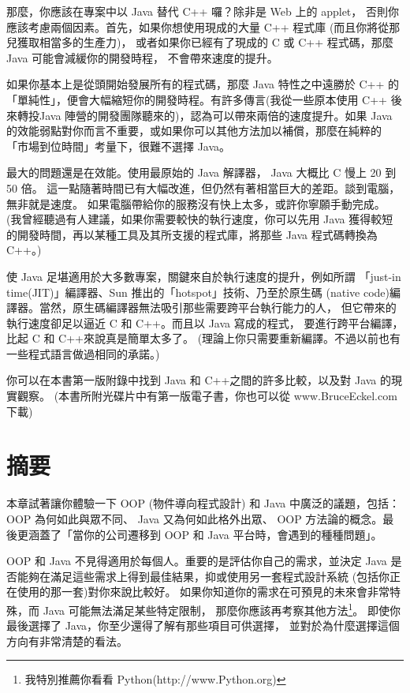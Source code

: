 那麼，你應該在專案中以 Java 替代 C++ 囉？除非是 Web 上的 applet，
否則你應該考慮兩個因素。首先，如果你想使用現成的大量 C++ 程式庫
(而且你將從那兒獲取相當多的生產力)，
或者如果你已經有了現成的 C 或 C++ 程式碼，那麼 Java 可能會減緩你的開發時程，
不會帶來速度的提升。

如果你基本上是從頭開始發展所有的程式碼，那麼 Java 特性之中遠勝於
C++ 的「單純性」，便會大幅縮短你的開發時程。有許多傳言(我從一些原本使用
C++ 後來轉投Java 陣營的開發團隊聽來的)，認為可以帶來兩倍的速度提升。如果
Java 的效能弱點對你而言不重要，或如果你可以其他方法加以補償，那麼在純粹的
「市場到位時間」考量下，很難不選擇 Java。

最大的問題還是在效能。使用最原始的 Java 解譯器， Java 大概比 C 慢上 20 到50 倍。
這一點隨著時間已有大幅改進，但仍然有著相當巨大的差距。談到電腦，無非就是速度。
如果電腦帶給你的服務沒有快上太多，或許你寧願手動完成。
(我曾經聽過有人建議，如果你需要較快的執行速度，你可以先用 Java
獲得較短的開發時間，再以某種工具及其所支援的程式庫，將那些 Java 程式碼轉換為
C++。)

使 Java 足堪適用於大多數專案，關鍵來自於執行速度的提升，例如所謂
「just-in time(JIT)」編譯器、Sun 推出的「hotspot」技術、乃至於原生碼
(native code)編譯器。當然，原生碼編譯器無法吸引那些需要跨平台執行能力的人，
但它帶來的執行速度卻足以逼近 C 和 C++。而且以 Java 寫成的程式，
要進行跨平台編譯，比起 C 和 C++來說真是簡單太多了。
(理論上你只需要重新編譯。不過以前也有一些程式語言做過相同的承諾。)

你可以在本書第一版附錄中找到 Java 和 C++之間的許多比較，以及對 Java 的現實觀察。
(本書所附光碟片中有第一版電子書，你也可以從 www.BruceEckel.com 下載)
\section{摘要}
本章試著讓你體驗一下 OOP (物件導向程式設計) 和 Java 中廣泛的議題，包括：
OOP 為何如此與眾不同、 Java 又為何如此格外出眾、 OOP
方法論的概念。最後更涵蓋了「當你的公司遷移到
OOP 和 Java 平台時，會遇到的種種問題」。

OOP 和 Java 不見得適用於每個人。重要的是評估你自己的需求，並決定
Java 是否能夠在滿足這些需求上得到最佳結果，抑或使用另一套程式設計系統
(包括你正在使用的那一套)對你來說比較好。
如果你知道你的需求在可預見的未來會非常特殊，而 Java 可能無法滿足某些特定限制，
那麼你應該再考察其他方法\footnote{我特別推薦你看看
Python(http://www.Python.org)}。
即使你最後選擇了 Java，你至少還得了解有那些項目可供選擇，
並對於為什麼選擇這個方向有非常清楚的看法。


